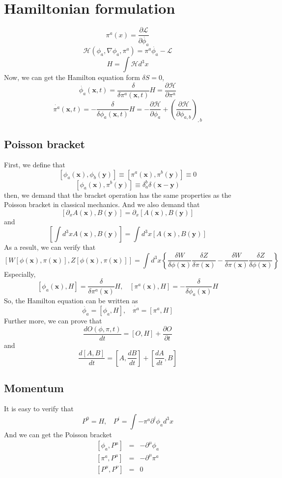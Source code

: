 \section{Hamiltonian formulation}
\[\pi^a(x) = \frac{\partial \mathcal{L}}{\partial \dot{\phi_a}}\]
\[\mathcal{H}(\phi_a,\nabla \phi_a,\pi^a) = \pi^a \dot{\phi_a} - \mathcal{L}\]
\[H = \int \mathcal{H} d^3 x\]
Now, we can get the Hamilton equation form $\delta S =0$,
\[\dot{\phi_a}(\bm{x},t) = \frac{\delta}{\delta \pi^a(\bm{x},t)} H = \frac{\partial \mathcal{H}}{\partial \pi^a}\]
\[\dot{\pi^a}(\bm{x},t) = -\frac{\delta}{\delta \phi_a(\bm{x},t)} H = - \frac{\partial \mathcal{H}}{\partial \phi_a} + \left(\frac{\partial \mathcal{H}}{\partial \phi_{a,b}}\right)_{,b}\]

\subsection{Poisson bracket}

First, we define that
\[[\phi_a(\bm{x}),\phi_b(\bm{y})] \equiv [\pi^a(\bm{x}),\pi^b(\bm{y})] \equiv 0\]
\[[\phi_a(\bm{x}),\pi^b(\bm{y})] \equiv \delta^{b}_{a} \delta(\bm{x}-\bm{y})\]
then, we demand that the bracket operation has the same properties as the Poisson bracket in classical mechanics. And we also demand that
\[[\partial_x A(\bm{x}),B(\bm{y})] = \partial_x [A(\bm{x}),B(\bm{y})]\]
and
\[\left[\int d^3 x A(\bm{x}),B(\bm{y})\right] = \int d^3 x [A(\bm{x}),B(\bm{y})]\]
As a result, we can verify that
\[[W[\phi(\bm{x}),\pi(\bm{x})],Z[\phi(\bm{x}),\pi(\bm{x})]] = \int d^3x \left\{ \frac{\delta W}{\delta \phi(\bm{x})} \frac{\delta Z}{\delta \pi(\bm{x})} - \frac{\delta W}{\delta \pi(\bm{x})} \frac{\delta Z}{\delta \phi(\bm{x})} \right\}\]
Especially,
\[[\phi_a(\bm{x}),H] = \frac{\delta }{\delta \pi^a(\bm{x})} H, \ \ \ \ [\pi^a(\bm{x}),H] = -\frac{\delta }{\delta \phi_a(\bm{x})} H\]
So, the Hamilton equation can be written as
\[\dot{\phi_a} = [\phi_a,H], \ \ \ \ \dot{\pi^a} = [\pi^a,H]\]
Further more, we can prove that
\[\frac{dO(\phi,\pi,t)}{dt} = [O,H] + \frac{\partial O}{\partial t}\]
and
\[\frac{d[A,B]}{dt} = [A,\frac{dB}{dt}] + [\frac{dA}{dt},B]  \]

\subsection{Momentum}

It is easy to verify that
\[P^{0} = H, \ \ \ \ P^{i} = \int -\pi^a \partial^i \phi_a d^3 x\]
And we can get the Poisson bracket
\begin{eqnarray}
	\left[\phi_a,P^{\mu}\right] &=& -\partial^{\mu} \phi_a \nonumber \\
	\left[\pi^a,P^{\mu}\right] &=& -\partial^{\mu} \pi^a \nonumber \\
	\left[P^{\mu},P^{\nu}\right] &=& 0 \nonumber 
\end{eqnarray}


